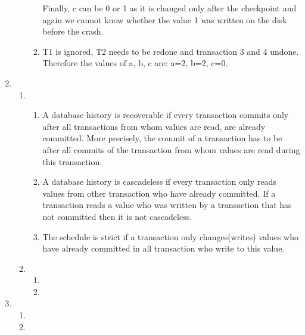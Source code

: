 \documentclass[12pt]{extarticle}
\begin{document}
\begin{flushleft}
\begin{enumerate}[label=\textbf{\Alph*.}]
\begin{enumerate}[label=\arabic*.]
\begin{enumerate}[label=(\alph*)]
Finally, c can be 0 or 1 as it is changed only after the checkpoint and again we cannot know whether the value 1 was written on the disk before the crash. 
\item T1 is ignored, T2 needs to be redone and transaction 3 and 4 undone. Therefore the values of a, b, c are: a=2, b=2, c=0. 
\end{enumerate}
\end{enumerate}
\item 
\begin{enumerate}[label=\arabic*.]
\item \begin{enumerate}[label=(\alph*)]
\item A database history is recoverable if every transaction commits only after all transactions from whom values are read, are already committed. More precisely, the commit of a transaction has to be after all commits of the transaction from whom values are read during this transaction. 
\item A database history is cascadeless if every transaction only reads values from other transaction who have already committed. If a transaction reads a value who was written by a transaction that has not committed then it is not cascadeless.
\item The schedule is strict if a transaction only changes(writes) values who have already committed in all transaction who write to this value.  
\end{enumerate}
\item \begin{enumerate}[label=(\alph*)]
\item
\item
\end{enumerate}
\end{enumerate}
\item \begin{enumerate}[label=(\alph*)]
\item
\item
\end{enumerate}

\end{enumerate}
\end{flushleft}
\end{document}
